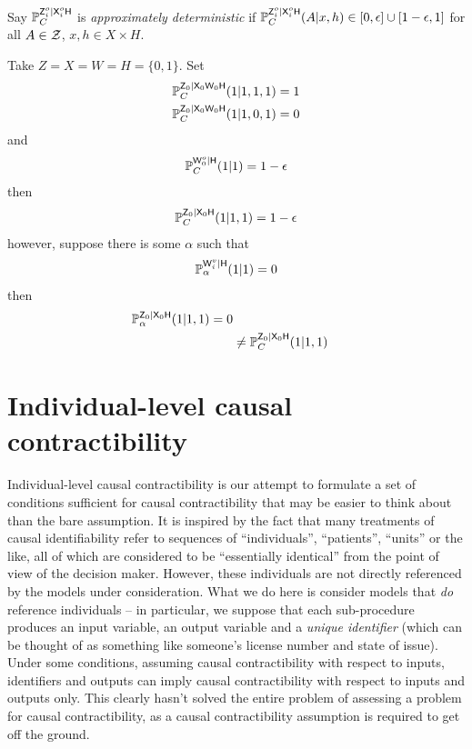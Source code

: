 \begin{example}
Say $\mathbb{P}_C^{\mathsf{Z}^o_i|\mathsf{X}^o_i\mathsf{H}}$ is \emph{approximately deterministic} if $\mathbb{P}_C^{\mathsf{Z}^o_i|\mathsf{X}^o_i\mathsf{H}}(A|x,h)\in [0,\epsilon]\cup[1-\epsilon,1]$ for all $A\in\mathcal{Z}$, $x,h\in X\times H$.

Take $Z=X=W=H=\{0,1\}$. Set
\begin{align}
    \mathbb{P}_C^{\mathsf{Z}_0|\mathsf{X}_0\mathsf{W}_0\mathsf{H}}(1|1,1,1) = 1\\
    \mathbb{P}_C^{\mathsf{Z}_0|\mathsf{X}_0\mathsf{W}_0\mathsf{H}}(1|1,0,1) = 0
\end{align}
and
\begin{align}
    \mathbb{P}_C^{\mathsf{W}^o_0|\mathsf{H}}(1|1)=1-\epsilon
\end{align}
then
\begin{align}
    \mathbb{P}_C^{\mathsf{Z}_0|\mathsf{X}_0\mathsf{H}}(1|1,1) = 1-\epsilon
\end{align}
however, suppose there is some $\alpha$ such that
\begin{align}
    \mathbb{P}_\alpha^{\mathsf{W}^v_i|\mathsf{H}}(1|1)=0
\end{align}
then
\begin{align}
    \mathbb{P}_\alpha^{\mathsf{Z}_0|\mathsf{X}_0\mathsf{H}}(1|1,1) = 0\\
    &\neq \mathbb{P}_C^{\mathsf{Z}_0|\mathsf{X}_0\mathsf{H}}(1|1,1)
\end{align}
\end{example}


\section{Individual-level causal contractibility}\label{sec:ilevel_ccontract}

Individual-level causal contractibility is our attempt to formulate a set of conditions sufficient for causal contractibility that may be easier to think about than the bare assumption. It is inspired by the fact that many treatments of causal identifiability refer to sequences of ``individuals'', ``patients'', ``units'' or the like, all of which are considered to be ``essentially identical'' from the point of view of the decision maker. However, these individuals are not directly referenced by the models under consideration. What we do here is consider models that \emph{do} reference individuals -- in particular, we suppose that each sub-procedure produces an input variable, an output variable and a \emph{unique identifier} (which can be thought of as something like someone's license number and state of issue). Under some conditions, assuming causal contractibility with respect to inputs, identifiers and outputs can imply causal contractibility with respect to inputs and outputs only. This clearly hasn't solved the entire problem of assessing a problem for causal contractibility, as a causal contractibility assumption is required to get off the ground.

